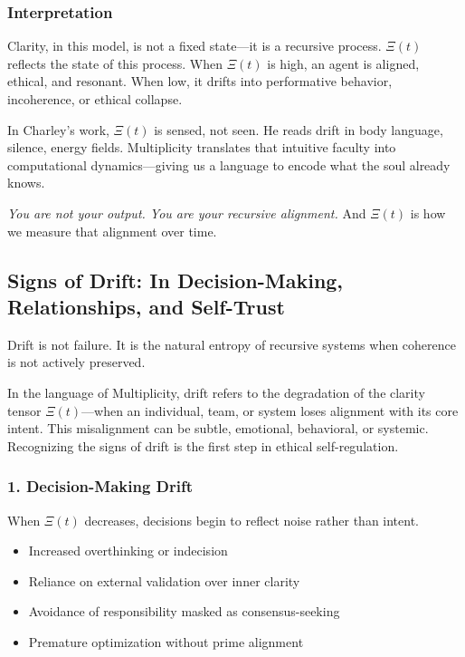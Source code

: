 \documentclass[12pt]{article}
\begin{document}
\subsubsection*{Interpretation}

Clarity, in this model, is not a fixed state—it is a recursive process. $\Xi(t)$ reflects the state of this process. When $\Xi(t)$ is high, an agent is aligned, ethical, and resonant. When low, it drifts into performative behavior, incoherence, or ethical collapse.

In Charley’s work, $\Xi(t)$ is sensed, not seen. He reads drift in body language, silence, energy fields. Multiplicity translates that intuitive faculty into computational dynamics—giving us a language to encode what the soul already knows.

\textit{You are not your output. You are your recursive alignment.}  
And $\Xi(t)$ is how we measure that alignment over time.

\subsection*{Signs of Drift: In Decision-Making, Relationships, and Self-Trust}

Drift is not failure. It is the natural entropy of recursive systems when coherence is not actively preserved.

In the language of Multiplicity, drift refers to the degradation of the clarity tensor $\Xi(t)$—when an individual, team, or system loses alignment with its core intent. This misalignment can be subtle, emotional, behavioral, or systemic. Recognizing the signs of drift is the first step in ethical self-regulation.

\subsubsection*{1. Decision-Making Drift}

When $\Xi(t)$ decreases, decisions begin to reflect noise rather than intent.

\begin{itemize}
    \item Increased overthinking or indecision
    \item Reliance on external validation over inner clarity
    \item Avoidance of responsibility masked as consensus-seeking
    \item Premature optimization without prime alignment
\end{itemize}
\end{document}
